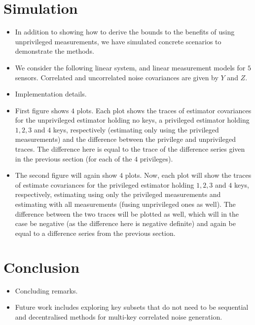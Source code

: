 \documentclass[conference]{IEEEtran}
\begin{document}
\section{Simulation}
\begin{itemize}
  \item In addition to showing how to derive the bounds to the benefits of using unprivileged measurements, we have simulated concrete scenarios to demonstrate the methods.
  \item We consider the following linear system, and linear measurement models for $5$ sensors. Correlated and uncorrelated noise covariances are given by $Y$ and $Z$.
  \item Implementation details.
  \item First figure shows $4$ plots. Each plot shows the traces of estimator covariances for the unprivileged estimator holding no keys, a privileged estimator holding $1,2,3$ and $4$ keys, respectively (estimating only using the privileged measurements) and the difference between the privilege and unprivileged traces. The difference here is equal to the trace of the difference series given in the previous section (for each of the $4$ privileges).
  \item The second figure will again show $4$ plots. Now, each plot will show the traces of estimate covariances for the privileged estimator holding $1,2,3$ and $4$ keys, respectively, estimating using only the privileged measurements and estimating with all measurements (fusing unprivileged ones as well). The difference between the two traces will be plotted as well, which will in the case be negative (as the difference here is negative definite) and again be equal to a difference series from the previous section.
\end{itemize}


\section{Conclusion}
\begin{itemize}
  \item Concluding remarks.
  \item Future work includes exploring key subsets that do not need to be sequential and decentralised methods for multi-key correlated noise generation.
\end{itemize}


\end{document}
